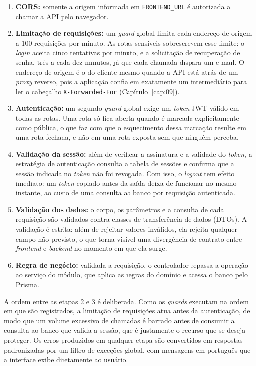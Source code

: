 \begin{enumerate}
    \item \textbf{CORS:} somente a origem informada em \texttt{FRONTEND\_URL} é autorizada a chamar a API pelo navegador.
    \item \textbf{Limitação de requisições:} um \textit{guard} global limita cada endereço de origem a 100 requisições por minuto. As rotas sensíveis sobrescrevem esse limite: o \textit{login} aceita cinco tentativas por minuto, e a solicitação de recuperação de senha, três a cada dez minutos, já que cada chamada dispara um e-mail. O endereço de origem é o do cliente mesmo quando a API está atrás de um \textit{proxy} reverso, pois a aplicação confia em exatamente um intermediário para ler o cabeçalho \texttt{X-Forwarded-For} (Capítulo~\ref{cap:09}).
    \item \textbf{Autenticação:} um segundo \textit{guard} global exige um \textit{token} JWT válido em todas as rotas. Uma rota só fica aberta quando é marcada explicitamente como pública, o que faz com que o esquecimento dessa marcação resulte em uma rota fechada, e não em uma rota exposta sem que ninguém perceba.
    \item \textbf{Validação da sessão:} além de verificar a assinatura e a validade do \textit{token}, a estratégia de autenticação consulta a tabela de sessões e confirma que a sessão indicada no \textit{token} não foi revogada. Com isso, o \textit{logout} tem efeito imediato: um \textit{token} copiado antes da saída deixa de funcionar no mesmo instante, ao custo de uma consulta ao banco por requisição autenticada.
    \item \textbf{Validação dos dados:} o corpo, os parâmetros e a consulta de cada requisição são validados contra classes de transferência de dados (DTOs). A validação é estrita: além de rejeitar valores inválidos, ela rejeita qualquer campo não previsto, o que torna visível uma divergência de contrato entre \textit{frontend} e \textit{backend} no momento em que ela surge.
    \item \textbf{Regra de negócio:} validada a requisição, o controlador repassa a operação ao serviço do módulo, que aplica as regras do domínio e acessa o banco pelo Prisma.
\end{enumerate}

A ordem entre as etapas 2 e 3 é deliberada. Como os \textit{guards} executam na ordem em que são registrados, a limitação de requisições atua antes da autenticação, de modo que um volume excessivo de chamadas é barrado antes de consumir a consulta ao banco que valida a sessão, que é justamente o recurso que se deseja proteger. Os erros produzidos em qualquer etapa são convertidos em respostas padronizadas por um filtro de exceções global, com mensagens em português que a interface exibe diretamente ao usuário.

